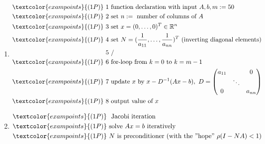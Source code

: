 {\color{solution}
\begin{enumerate}
	\item \begin{align*}
	\textcolor{exampoints}{(1P)}~&1~ \text{function declaration with input}~ A,b,m:=50\\
	\textcolor{exampoints}{(1P)}~&2~\text{set}~n:=~\text{number of columns of}~A\\
	\textcolor{exampoints}{(1P)}~&3~\text{set}~x=(0,\dots,0)^T\in\mathbb{R}^n\\
	\textcolor{exampoints}{(1P)}~&4~\text{set}~N=(\frac{1}{a_{11}},\dots,\frac{1}{a_{nn}})^T~\text{(inverting diagonal elements)}\\
	&5~/\\
	\textcolor{exampoints}{(1P)}~&6~\text{for-loop from}~k=0~\text{to}~k=m-1\\
	\textcolor{exampoints}{(1P)}~&7~\text{update}~x~\text{by}~x-D^{-1}(Ax-b),~D
	=\begin{pmatrix}a_{11}& &0\\ &\ddots& \\0& &a_{nn}\end{pmatrix}\\
	\textcolor{exampoints}{(1P)}~&8~\text{output value of}~x
	\end{align*}
	\item \begin{align*}\textcolor{exampoints}{(1P)}~&\text{ Jacobi iteration}\\
	\textcolor{exampoints}{(1P)}~&\text{solve}~Ax=b~\text{iteratively}\\
	\textcolor{exampoints}{(1P)}~&N~\text{is preconditioner}~(\text{with the ''hope''}~\rho(I-NA)<1)\end{align*}
\end{enumerate}
}